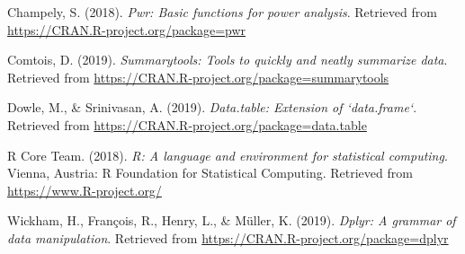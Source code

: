 \documentclass[man]{apa6}
\begin{document}
\hypertarget{ref-R-pwr}{}
Champely, S. (2018). \emph{Pwr: Basic functions for power analysis}.
Retrieved from \url{https://CRAN.R-project.org/package=pwr}

\hypertarget{ref-R-summarytools}{}
Comtois, D. (2019). \emph{Summarytools: Tools to quickly and neatly
summarize data}. Retrieved from
\url{https://CRAN.R-project.org/package=summarytools}

\hypertarget{ref-R-data.table}{}
Dowle, M., \& Srinivasan, A. (2019). \emph{Data.table: Extension of
`data.frame`}. Retrieved from
\url{https://CRAN.R-project.org/package=data.table}

\hypertarget{ref-R-base}{}
R Core Team. (2018). \emph{R: A language and environment for statistical
computing}. Vienna, Austria: R Foundation for Statistical Computing.
Retrieved from \url{https://www.R-project.org/}

\hypertarget{ref-R-dplyr}{}
Wickham, H., François, R., Henry, L., \& Müller, K. (2019). \emph{Dplyr:
A grammar of data manipulation}. Retrieved from
\url{https://CRAN.R-project.org/package=dplyr}

\endgroup
\end{document}
